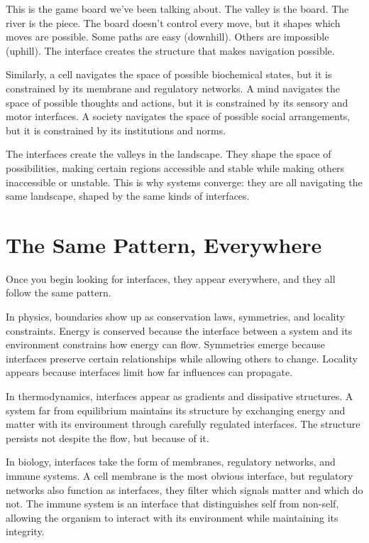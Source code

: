 \documentclass[
  openright]{book}
\begin{document}
This is the game board we've been talking about. The valley is the
board. The river is the piece. The board doesn't control every move, but
it shapes which moves are possible. Some paths are easy (downhill).
Others are impossible (uphill). The interface creates the structure that
makes navigation possible.

Similarly, a cell navigates the space of possible biochemical states,
but it is constrained by its membrane and regulatory networks. A mind
navigates the space of possible thoughts and actions, but it is
constrained by its sensory and motor interfaces. A society navigates the
space of possible social arrangements, but it is constrained by its
institutions and norms.

The interfaces create the valleys in the landscape. They shape the space
of possibilities, making certain regions accessible and stable while
making others inaccessible or unstable. This is why systems converge:
they are all navigating the same landscape, shaped by the same kinds of
interfaces.

\section{The Same Pattern,
Everywhere}\label{the-same-pattern-everywhere}

Once you begin looking for interfaces, they appear everywhere, and they
all follow the same pattern.

In physics, boundaries show up as conservation laws, symmetries, and
locality constraints. Energy is conserved because the interface between
a system and its environment constrains how energy can flow. Symmetries
emerge because interfaces preserve certain relationships while allowing
others to change. Locality appears because interfaces limit how far
influences can propagate.

In thermodynamics, interfaces appear as gradients and dissipative
structures. A system far from equilibrium maintains its structure by
exchanging energy and matter with its environment through carefully
regulated interfaces. The structure persists not despite the flow, but
because of it.

In biology, interfaces take the form of membranes, regulatory networks,
and immune systems. A cell membrane is the most obvious interface, but
regulatory networks also function as interfaces, they filter which
signals matter and which do not. The immune system is an interface that
distinguishes self from non-self, allowing the organism to interact with
its environment while maintaining its integrity.
\end{document}
